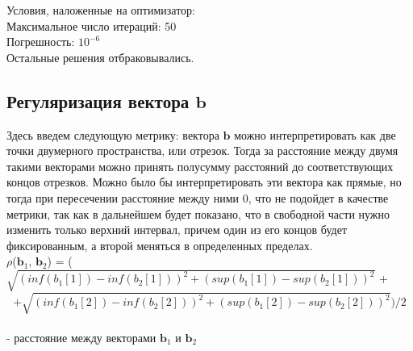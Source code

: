 \documentclass[../body.tex]{subfiles}
\begin{document}
Условия, наложенные на оптимизатор:
\\Максимальное число итераций: 50
\\Погрешность: $10^{-6}$
\\Остальные решения отбраковывались.

\subsection{Регуляризация вектора $\textbf{b}$}
Здесь введем следующую метрику: вектора $\textbf{b}$ можно интерпретировать как две точки двумерного пространства, или отрезок. Тогда за расстояние между двумя такими векторами можно принять полусумму расстояний до соответствующих концов отрезков. Можно было бы интерпретировать эти вектора как прямые, но тогда при пересечении расстояние между ними 0, что не подойдет в качестве метрики, так как в дальнейшем будет показано, что в свободной части нужно изменить только верхний интервал, причем один из его концов будет фиксированным, а второй меняться в определенных пределах.
\\$\rho$($\textbf{b}_1$, $\textbf{b}_2$) = ($\sqrt{(inf(b_1[1]) - inf(b_2[1]))^2 + (sup(b_1[1]) - sup(b_2[1]))^2}$ + 
\begin{equation}
  +\sqrt{(inf(b_1[2]) - inf(b_2[2]))^2 + (sup(b_1[2]) - sup(b_2[2]))^2})/2  \label{metric}
\end{equation}
\\ - расстояние между векторами $\textbf{b}_1$ и $\textbf{b}_2$ 
\end{document}
